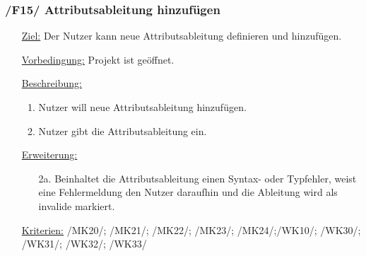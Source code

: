 \documentclass{article}
\begin{document}
\subsubsection*{\textbf{/F15/} Attributsableitung hinzufügen} \label{sec:f:Attributsableitung hinzufügen}
\begin{itemize}
    \item[\underline{Ziel:}] Der Nutzer kann neue Attributsableitung definieren und hinzufügen. 
    \item[\underline{Vorbedingung:}] Projekt ist geöffnet.
    \item[\underline{Beschreibung:}]
    \begin{enumerate}
        \item Nutzer will neue Attributsableitung hinzufügen.
        \item Nutzer gibt die Attributsableitung ein.
    \end{enumerate}
    \item[\underline{Erweiterung:}]
    \begin{itemize}
        \item[2a.] Beinhaltet die Attributsableitung einen Syntax- oder Typfehler, weist eine Fehlermeldung den Nutzer daraufhin und die Ableitung wird als invalide markiert. 
    \end{itemize}
    \item[\underline{Kriterien:}] /MK20/; /MK21/; /MK22/; /MK23/; /MK24/;\newline/WK10/; /WK30/; /WK31/; /WK32/; /WK33/
\end{itemize}
\end{document}
